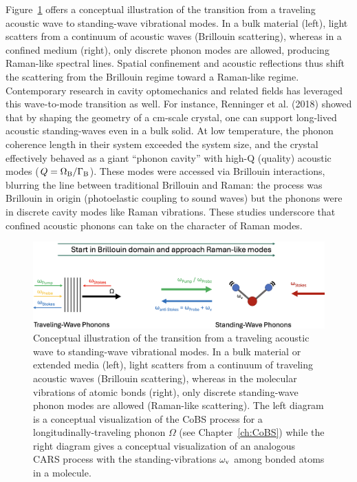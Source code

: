 Figure~\ref{fig:Raman:BrillouinRamanTransition} offers a conceptual illustration of the transition from a traveling acoustic wave to standing-wave vibrational modes. In a bulk material (left), light scatters from a continuum of acoustic waves (Brillouin scattering), whereas in a confined medium (right), only discrete phonon modes are allowed, producing Raman-like spectral lines. Spatial confinement and acoustic reflections thus shift the scattering from the Brillouin regime toward a Raman-like regime. Contemporary research in cavity optomechanics and related fields has leveraged this wave-to-mode transition as well. For instance, Renninger et al. (2018) \cite{renninger2018bulk} showed that by shaping the geometry of a \si{\centi\meter}-scale crystal, one can support long-lived acoustic standing-waves even in a bulk solid. At low temperature, the phonon coherence length in their system exceeded the system size, and the crystal effectively behaved as a giant ``phonon cavity'' with high-Q (quality) acoustic modes (\(Q = \Omega_{\rm B}/\Gamma_{\rm B}\)). \cite{renninger2018bulk, maccabe2020nano} These modes were accessed via Brillouin interactions, blurring the line between traditional Brillouin and Raman: the process was Brillouin in origin (photoelastic coupling to sound waves) but the phonons were in discrete cavity modes like Raman vibrations. These studies underscore that confined acoustic phonons can take on the character of Raman modes.

\begin{figure}[t]
  \centering
  \includegraphics[width=\textwidth]{figs/4-Raman/ExploreBrillouinRamanTransition.png}
  \vspace{0.5em}
  \caption[Conceptual illustration of the transition from a traveling acoustic wave to standing-wave vibrational modes.]{Conceptual illustration of the transition from a traveling acoustic wave to standing-wave vibrational modes. In a bulk material or extended media (left), light scatters from a continuum of traveling acoustic waves (Brillouin scattering), whereas in the molecular vibrations of atomic bonds (right), only discrete standing-wave phonon modes are allowed (Raman-like scattering). The left diagram is a conceptual visualization of the \acs{CoBS} process for a longitudinally-traveling phonon \(\Omega\) (see Chapter~\ref{ch:CoBS}) while the right diagram gives a conceptual visualization of an analogous \ac{CARS} process with the standing-vibrations \(\omega_{\rm v}\) among bonded atoms in a molecule.}
  \label{fig:Raman:BrillouinRamanTransition}
\end{figure}

